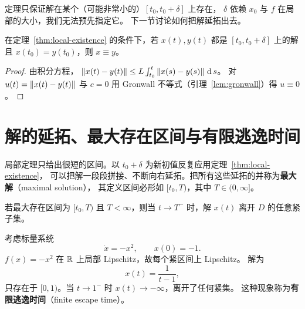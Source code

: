 \begin{remark}
  定理只保证解在某个（可能非常小的）$[t_0,t_0+\delta]$ 上存在，
  $\delta$ 依赖 $x_0$ 与 $f$ 在局部的大小，我们无法预先指定它。
  下一节讨论如何把解延拓出去。
\end{remark}

\begin{corollary}[唯一性]\label{cor:uniqueness}
  在定理~\ref{thm:local-existence} 的条件下，若 $x(t),y(t)$ 都是 $[t_0,t_0+\delta]$ 上的解且 $x(t_0)=y(t_0)$，则 $x\equiv y$。
\end{corollary}

\begin{proof}
  由积分方程，
  $\left\lVert x(t)-y(t)\right\rVert\le L\int_{t_0}^{t}\left\lVert x(s)-y(s)\right\rVert\,\operatorname{d} s$。
  对 $u(t)=\left\lVert x(t)-y(t)\right\rVert$ 与 $c=0$ 用 Gronwall 不等式（引理~\ref{lem:gronwall}）得 $u\equiv0$。
\end{proof}

\section{解的延拓、最大存在区间与有限逃逸时间}\label{sec:maximal-interval}

局部定理只给出很短的区间。以 $t_0+\delta$ 为新初值反复应用定理~\ref{thm:local-existence}，
可以把解一段段拼接、不断向右延拓。把所有这些延拓的并称为\textbf{最大解}（maximal solution），
其定义区间必形如 $[t_0,T)$，其中 $T\in(0,\infty]$。

\begin{lemma}[有限时刻离开紧集]\label{lem:leaves-compact}
  若最大存在区间为 $[t_0,T)$ 且 $T<\infty$，则当 $t\to T^-$ 时，解 $x(t)$ 离开 $D$ 的任意紧子集。
  \cite[Exercise 3.26]{khalilNonlinearSystems}
\end{lemma}

\begin{example}[有限逃逸时间]\label{ex:finite-escape}
  考虑标量系统
  \begin{equation}
    \dot x=-x^2,\qquad x(0)=-1 .
  \end{equation}
  $f(x)=-x^2$ 在 $\mathbb{R}$ 上局部 Lipschitz，故每个紧区间上 Lipschitz。
  解为
  \begin{equation}
    x(t)=\frac{1}{t-1},
  \end{equation}
  只存在于 $[0,1)$。当 $t\to1^-$ 时 $x(t)\to-\infty$，离开了任何紧集。
  这种现象称为\textbf{有限逃逸时间}（finite escape time）。
  \cite[Example 3.3]{khalilNonlinearSystems}\cite[Example 1.3]{khalilNonlinearControl2015}
\end{example}

